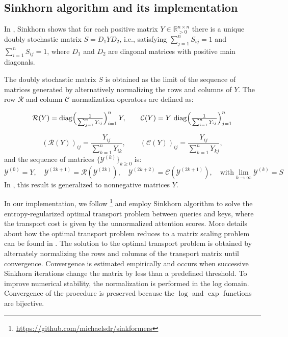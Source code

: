 \documentclass{article}
\theoremstyle{definition}
\theoremstyle{plain}
\begin{document}
\begin{appendices}


\section{{Sinkhorn algorithm and its implementation}} \label{apx:app-sinkhorn}

In \cite{Sinkhorn1964}, Sinkhorn shows that for each positive matrix $Y \in \mathbb{R}_{>0}^{n\times n}$ there is a unique doubly stochastic matrix $S = D_1 Y D_2$, i.e., satisfying $\sum_{j=1}^n S_{ij} = 1$ and $\sum_{i=1}^n S_{ij} = 1$, where $D_1$ and $D_2$ are diagonal matrices with positive main diagonals.

The doubly stochastic matrix $S$ is obtained as the limit of the sequence of matrices generated by alternatively normalizing the rows and columns of $Y$. The row $\mathcal{R}$ and column $\mathcal{C}$ normalization operators are defined as:

\[
\mathcal{R}(Y) = \operatorname{diag}\Bigl(\tfrac{1}{\sum_{j=1}^n Y_{ij}}\Bigr)_{i=1}^n\,Y,\qquad
\mathcal{C}(Y) = Y\,\operatorname{diag}\Bigl(\tfrac{1}{\sum_{i=1}^n Y_{ij}}\Bigr)_{j=1}^n
\]

\begin{equation}\label{eq:sink}
(\mathcal{R}(Y))_{ij} = \frac{Y_{ij}}{\sum_{k=1}^nY_{ik}},\qquad
(\mathcal{C}(Y))_{ij} = \frac{Y_{ij}}{\sum_{k=1}^nY_{kj}},
\end{equation}
and the sequence of matrices $\{\mathcal{Y}^{(k)}\}_{k\ge0}$ is:
\[
\mathcal{Y}^{(0)} = Y,\quad \mathcal{Y}^{(2k+1)} = \mathcal{R}(\mathcal{Y}^{(2k)}),\quad \mathcal{Y}^{(2k+2)} = \mathcal{C}(\mathcal{Y}^{(2k+1)}),\quad \text{with} \lim_{k\to\infty} \mathcal{Y}^{(k)} = S 
\]
In \cite{Sinkhorn1967ConcerningNM}, this result is generalized to nonnegative matrices $Y$.

In our implementation, we follow \cite{sinkformer}\footnote{\url{https://github.com/michaelsdr/sinkformers}} and employ Sinkhorn algorithm to solve the entropy-regularized optimal transport problem between queries and keys, where the transport cost is given by the unnormalized attention scores. More details about how the optimal transport problem reduces to a matrix scaling problem can be found in \cite{vialard:hal-02303456}. The solution to the optimal transport problem is obtained by alternately normalizing the rows and columns of the transport matrix until convergence. Convergence is estimated empirically and occurs when successive Sinkhorn iterations change the matrix by less than a predefined threshold. To improve numerical stability, the normalization is performed in the log domain. Convergence of the procedure is preserved because the $\log$ and $\exp$ functions are bijective.


\end{appendices}
\end{document}
